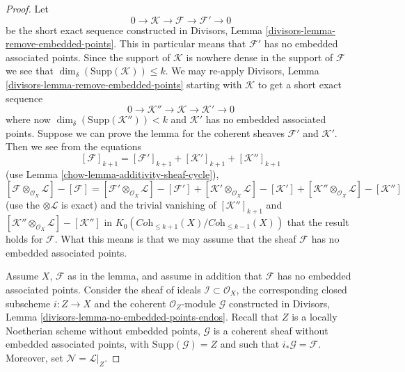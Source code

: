 \begin{proof}

Let
$$
0 \to \mathcal{K} \to \mathcal{F} \to \mathcal{F}' \to 0
$$
be the short exact sequence constructed in
Divisors, Lemma \ref{divisors-lemma-remove-embedded-points}.
This in particular means that $\mathcal{F}'$ has no embedded
associated points.
Since the support of $\mathcal{K}$ is nowhere dense in the
support of $\mathcal{F}$ we see that
$\dim_\delta(\text{Supp}(\mathcal{K})) \leq k$. We may
re-apply
Divisors, Lemma \ref{divisors-lemma-remove-embedded-points}
starting with $\mathcal{K}$ to get a short exact sequence
$$
0 \to \mathcal{K}'' \to \mathcal{K} \to \mathcal{K}' \to 0
$$
where now $\dim_\delta(\text{Supp}(\mathcal{K}'')) < k$
and $\mathcal{K}'$ has no embedded associated points.
Suppose we can prove the lemma for the coherent sheaves
$\mathcal{F}'$ and $\mathcal{K}'$. Then we see
from the equations
$$
[\mathcal{F}]_{k + 1}
=
[\mathcal{F}']_{k + 1}
+ [\mathcal{K}']_{k + 1}
+ [\mathcal{K}'']_{k + 1}
$$
(use Lemma \ref{chow-lemma-additivity-sheaf-cycle}),
$$
[\mathcal{F} \otimes_{\mathcal{O}_X} \mathcal{L}]
-
[\mathcal{F}]
=
[\mathcal{F}' \otimes_{\mathcal{O}_X} \mathcal{L}]
-
[\mathcal{F}']
+
[\mathcal{K}' \otimes_{\mathcal{O}_X} \mathcal{L}]
-
[\mathcal{K}']
+
[\mathcal{K}'' \otimes_{\mathcal{O}_X} \mathcal{L}]
-
[\mathcal{K}'']
$$
(use the $\otimes \mathcal{L}$ is exact)
and the trivial vanishing of $[\mathcal{K}'']_{k + 1}$ and
$[\mathcal{K}'' \otimes_{\mathcal{O}_X} \mathcal{L}]
- [\mathcal{K}'']$ in
$K_0(\textit{Coh}_{\leq k + 1}(X)/\textit{Coh}_{\leq k - 1}(X))$
that the result holds
for $\mathcal{F}$. What this means is that we may assume that
the sheaf $\mathcal{F}$ has no embedded associated points.

\medskip\noindent
Assume $X$, $\mathcal{F}$ as in the lemma, and assume in addition
that $\mathcal{F}$ has no embedded associated points. Consider the
sheaf of ideals $\mathcal{I} \subset \mathcal{O}_X$, the corresponding
closed subscheme $i : Z \to X$ and the coherent $\mathcal{O}_Z$-module
$\mathcal{G}$ constructed in
Divisors, Lemma \ref{divisors-lemma-no-embedded-points-endos}.
Recall that $Z$ is a locally Noetherian scheme without embedded points,
$\mathcal{G}$ is a coherent sheaf without embedded
associated points, with $\text{Supp}(\mathcal{G}) = Z$
and such that $i_*\mathcal{G} = \mathcal{F}$.
Moreover, set $\mathcal{N} = \mathcal{L}|_Z$.


\end{proof}
